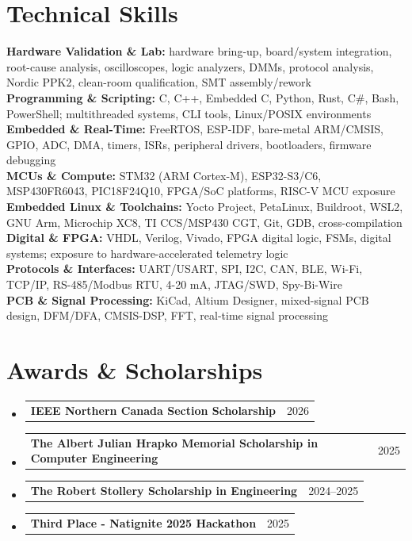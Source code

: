 \documentclass[letterpaper,11pt]{article}
\makeatletter
\newcommand{\resumeAward}[2]{
  \item
  \begin{tabular*}{0.97\textwidth}{l@{\extracolsep{\fill}}r}
    \small #1 & \small #2 \\
  \end{tabular*}\vspace{-6pt}
}
\newcommand{\resumeSubHeadingListStart}{\begin{itemize}[leftmargin=0.15in, label={}]}
\newcommand{\resumeSubHeadingListEnd}{\end{itemize}\vspace{-1pt}}
\makeatother
\begin{document}
\section{Technical Skills}
 \begin{itemize}[leftmargin=0.15in, label={}]
    \small{\item{
     \textbf{Hardware Validation \& Lab:} hardware bring-up, board/system integration, root-cause analysis, oscilloscopes, logic analyzers, DMMs, protocol analysis, Nordic PPK2, clean-room qualification, SMT assembly/rework \\
     \textbf{Programming \& Scripting:} C, C++, Embedded C, Python, Rust, C\#, Bash, PowerShell; multithreaded systems, CLI tools, Linux/POSIX environments \\
     \textbf{Embedded \& Real-Time:} FreeRTOS, ESP-IDF, bare-metal ARM/CMSIS, GPIO, ADC, DMA, timers, ISRs, peripheral drivers, bootloaders, firmware debugging \\
     \textbf{MCUs \& Compute:} STM32 (ARM Cortex-M), ESP32-S3/C6, MSP430FR6043, PIC18F24Q10, FPGA/SoC platforms, RISC-V MCU exposure \\
     \textbf{Embedded Linux \& Toolchains:} Yocto Project, PetaLinux, Buildroot, WSL2, GNU Arm, Microchip XC8, TI CCS/MSP430 CGT, Git, GDB, cross-compilation \\
     \textbf{Digital \& FPGA:} VHDL, Verilog, Vivado, FPGA digital logic, FSMs, digital systems; exposure to hardware-accelerated telemetry logic \\
     \textbf{Protocols \& Interfaces:} UART/USART, SPI, I2C, CAN, BLE, Wi-Fi, TCP/IP, RS-485/Modbus RTU, 4-20 mA, JTAG/SWD, Spy-Bi-Wire \\
     \textbf{PCB \& Signal Processing:} KiCad, Altium Designer, mixed-signal PCB design, DFM/DFA, CMSIS-DSP, FFT, real-time signal processing
    }}
 \end{itemize}

\section{Awards \& Scholarships}
  \resumeSubHeadingListStart
    \resumeAward{\textbf{IEEE Northern Canada Section Scholarship}}{2026}
    \resumeAward{\textbf{The Albert Julian Hrapko Memorial Scholarship in Computer Engineering}}{2025}
    \resumeAward{\textbf{The Robert Stollery Scholarship in Engineering}}{2024--2025}
    \resumeAward{\textbf{Third Place - Natignite 2025 Hackathon}}{2025}
  \resumeSubHeadingListEnd
\end{document}
